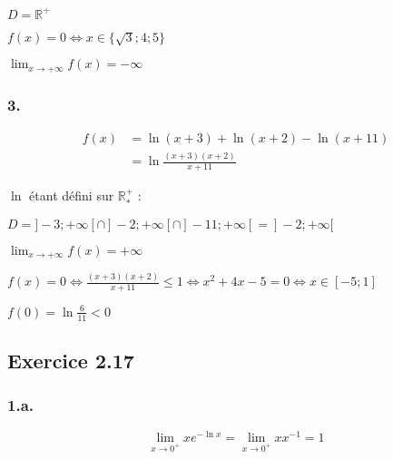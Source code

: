 \documentclass{report}
\begin{document}
$D = \mathbb{R}^{+}$

$f(x) = 0 \Longleftrightarrow x \in \{ \sqrt{3} ; 4 ; 5 \}$

$\lim_{x \rightarrow +\infty} f(x) = -\infty$



\subsubsection*{3.}
\begin{equation*}
	\begin{split}
		f(x) &= \ln(x+3) + \ln(x+2) - \ln(x+11) \\
		&= \ln \frac{(x+3)(x+2)}{x+11}
	\end{split}
\end{equation*}

$\ln$ étant défini sur $\mathbb{R}^{+}_{*}$ :

$D = ]-3 ; +\infty[ \cap ]-2 ; +\infty[ \cap ]-11 ; +\infty[ = ]-2 ; +\infty[$

$\lim_{x \rightarrow +\infty} f(x) = +\infty$

$f(x)=0 \Longleftrightarrow  \frac{(x+3)(x+2)}{x+11} \leq 1 \Longleftrightarrow x^2 +4x -5 =0 \Longleftrightarrow x \in [-5 ; 1]$

$f(0) = \ln\frac{6}{11} < 0$



\subsection*{Exercice 2.17}

\subsubsection*{1.a.}
\begin{displaymath}
	\lim_{x \rightarrow 0^{+}} x e^{-\ln x} = \lim_{x \rightarrow 0^{+}} x x^{-1} = 1
\end{displaymath}
\end{document}
